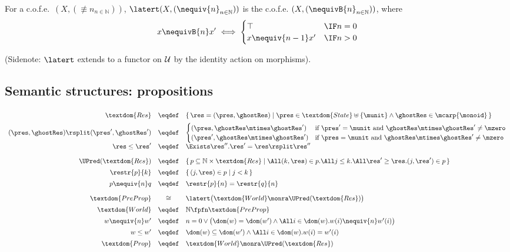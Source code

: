 For a c.o.f.e.\ $(X,(\nequiv{n}_{n\in\mathbb{N}}))$, 
$\latert (X,(\nequiv{n}_{n\in\mathbb{N}}))$ is the c.o.f.e.\@
$(X,(\nequivB{n}_{n\in\mathbb{N}}))$,  where
\[
x \nequivB{n} x' \iff \begin{cases}
\top	&\IF n=0 \\
x \nequiv{n-1} x' &\IF n>0
\end{cases}
\]

(Sidenote: $\latert$ extends to a functor on $\cal U$ by the identity
action on morphisms).


\subsection{Semantic structures: propositions}

\[
\begin{array}[t]{rcl}
\textdom{Res} &\eqdef&
\{\, \res = (\pres, \ghostRes) \mid
\pres \in \textdom{State} \uplus \{\munit\} \land \ghostRes \in \mcarp{\monoid} \,\} \\[0.5em]
(\pres, \ghostRes) \rsplit
(\pres', \ghostRes') &\eqdef&
\begin{cases}
(\pres, \ghostRes \mtimes \ghostRes')  & \mbox{if $\pres' = \munit$ and $\ghostRes \mtimes \ghostRes' \neq \mzero$} \\
(\pres', \ghostRes \mtimes \ghostRes') & \mbox{if $\pres = \munit$ and $\ghostRes \mtimes \ghostRes' \neq \mzero$}
\end{cases}
\\[0.5em]
%
\res \leq \res' & \eqdef &
\Exists \res''. \res' = \res \rsplit \res''\\[1em]
%
\UPred(\textdom{Res}) &\eqdef& 
\{\, p \subseteq \mathbb{N} \times \textdom{Res} \mid
\All (k,\res) \in p.
\All j\leq k.
\All \res' \geq \res.
(j,\res')\in p \,\}\\[0.5em]
\restr{p}{k} &\eqdef& 
\{\, (j, \res) \in p \mid j < k \,\}\\[0.5em]
p \nequiv{n} q & \eqdef & \restr{p}{n} = \restr{q}{n}\\[1em]
%
\textdom{PreProp} & \cong  &
\latert\big( \textdom{World} \monra \UPred(\textdom{Res})
\big)\\[0.5em]
%
\textdom{World} & \eqdef &
\mathbb{N} \fpfn \textdom{PreProp}\\[0.5em]
%
w \nequiv{n} w' & \eqdef & 
n = 0 \lor
\bigl(\dom(w) = \dom(w') \land \All i\in\dom(w). w(i) \nequiv{n} w'(i)\bigr)
\\[0.5em]
%
w \leq w' & \eqdef & 
\dom(w) \subseteq \dom(w') \land \All i \in \dom(w). w(i) = w'(i) 
\\[0.5em]
%
\textdom{Prop} & \eqdef & \textdom{World} \monra \UPred(\textdom{Res})
\end{array}
\]

